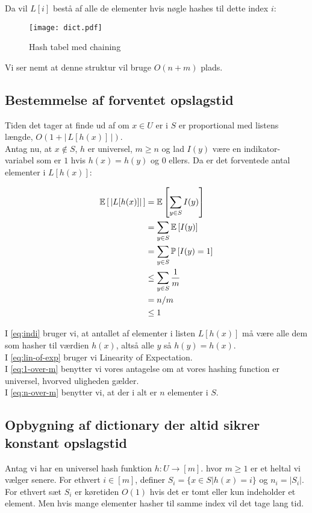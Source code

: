 Da vil $L[i]$ bestå af alle de elementer hvis nøgle hashes til dette index $i$:
\begin{figure}[H]
  \begin{center}
  \texttt{[image: dict.pdf]}
  \end{center}
  \caption{Hash tabel med chaining}
  \label{fig:hash}
\end{figure}

Vi ser nemt at denne struktur vil bruge $O(n + m)$ plads.

\subsection{Bestemmelse af forventet opslagstid}

Tiden det tager at finde ud af om $x \in U$ er i $S$ er proportional med listens længde, $O(1 + | \, L[h(x)] \, |)$.\\

Antag nu, at $x \notin S$, $h$ er universel, $m \geq n$ og lad $I(y)$ være en indikator-variabel som er $1$ hvis $h(x) = h(y)$ og $0$ ellers. Da er det forventede antal elementer i $L[h(x)]$:

\begin{align}
  \mathbb{E} \left[   \, |L[h(x)]| \,   \right]
  &= \mathbb{E} \left[   \sum_{y \in S} I(y)  \right] \label{eq:indi} \\
  &= \sum_{y \in S} \mathbb{E} \left[  I(y)  \right] \label{eq:lin-of-exp} \\
  &= \sum_{y \in S} \mathbb{P} \left[  I(y) = 1  \right] \nonumber \\
  &\leq \sum_{y \in S} \frac{1}{m} \label{eq:1-over-m} \\
  &= n/m \label{eq:n-over-m} \\
  &\leq 1 \nonumber
\end{align}

I \cref{eq:indi} bruger vi, at antallet af elementer i listen $L[h(x)]$ må være alle dem som hasher til værdien $h(x)$, altså alle $y$ så $h(y) = h(x)$.\\
I \cref{eq:lin-of-exp} bruger vi Linearity of Expectation.\\
I \cref{eq:1-over-m} benytter vi vores antagelse om at vores hashing function er universel, hvorved uligheden gælder.\\
I \cref{eq:n-over-m} benytter vi, at der i alt er $n$ elementer i $S$.






\subsection{Opbygning af dictionary der altid sikrer konstant opslagstid}
Antag vi har en universel hash funktion $h : U \rightarrow [m]$. hvor $m \geq 1$ er et heltal vi vælger senere. For ethvert $i \in [m]$, definer $S_i = \{ x \in S | h(x) = i \}$ og $n_i = |S_i|$. For ethvert sæt $S_i$ er køretiden $O(1)$ hvis det er tomt eller kun indeholder et element. Men hvis mange elementer hasher til samme index vil det tage lang tid.\\

